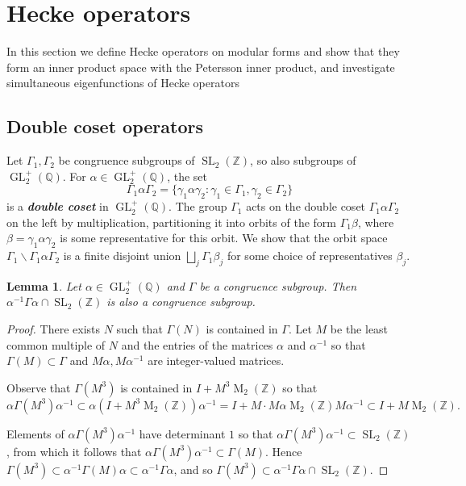 \documentclass[10pt,leqno,twoside]{article}
\theoremstyle{plain}
\newtheorem{lemma}[lem]{Lemma}
\theoremstyle{definition}
\numberwithin{equation}{section}
\numberwithin{lem}{section}
\newcommand{\textib}[1]{\textbf{\textit{#1\index{#1}}}} %
\DeclareMathOperator{\Mat}{M}
\DeclareMathOperator{\GL}{GL}
\DeclareMathOperator{\SL}{SL}
\newcommand{\slz}{\SL_2(\mathbb{Z})}
\newcommand{\glqp}{\GL_2^+(\mathbb{Q})}
\newcommand{\tbd}{{\Huge\color{red}{\textib{TBD}}}}
\begin{document}
\newpage\section{Hecke operators}
In this section we define Hecke operators on modular forms and show that they form an inner product space with the Petersson inner product, and investigate simultaneous eigenfunctions of Hecke operators \tbd
\subsection{Double coset operators}
Let $\varGamma_1,\varGamma_2$ be congruence subgroups of $\slz$, so also subgroups of $\glqp$. For $\alpha\in\glqp$, the set
\[\varGamma_1\alpha\varGamma_2 = \{\gamma_1\alpha\gamma_2 : \gamma_1\in\varGamma_1, \gamma_2\in\varGamma_2\}\] is a \textib{double coset} in $\glqp$. The group $\varGamma_1$ acts on the double coset $\varGamma_1\alpha\varGamma_2$ on the left by multiplication, partitioning it into orbits of the form $\varGamma_1\beta$, where $\beta = \gamma_1\alpha\gamma_2$ is some representative for this orbit. We show that the orbit space  $\varGamma_1\backslash\varGamma_1\alpha\varGamma_2$ is a finite disjoint union $\bigsqcup_j\varGamma_1\beta_j$ for some choice of representatives $\beta_j$.
\begin{lemma}\label{lem: conjugation congruence subgroup}
    Let $\alpha\in\glqp$ and $\varGamma$ be a congruence subgroup. Then $\alpha^{-1}\varGamma\alpha\cap\slz$ is also a congruence subgroup.
\end{lemma}
\begin{proof}
    There exists $N$ such that $\varGamma(N)$ is contained in $\varGamma$. Let $M$ be the least common multiple of $N$ and the entries of the matrices $\alpha$ and $\alpha^{-1}$ so that $\varGamma(M)\subset \varGamma$ and $M\alpha, M\alpha^{-1}$ are integer-valued matrices.
    
    Observe that $\varGamma(M^3)$ is contained in $I + M^3\Mat_2(\mathbb Z)$ so that 
    \[\alpha\varGamma(M^3)\alpha^{-1}\subset \alpha(I + M^3\Mat_2(\mathbb Z))\alpha^{-1} = I + M\cdot M\alpha \Mat_2(\mathbb Z) M\alpha^{-1}\subset I+M\Mat_2(\mathbb{Z}).\]
    
    Elements of $\alpha\varGamma(M^3)\alpha^{-1}$ have determinant $1$ so that $\alpha\varGamma(M^3)\alpha^{-1}\subset \slz$, from which it follows that $\alpha\varGamma(M^3)\alpha^{-1}\subset \varGamma(M)$. Hence $\varGamma(M^3)\subset \alpha^{-1}\varGamma(M)\alpha \subset \alpha^{-1}\varGamma\alpha$, and so $\varGamma(M^3)\subset \alpha^{-1}\varGamma\alpha\cap \slz$.
\end{proof}
\end{document}
